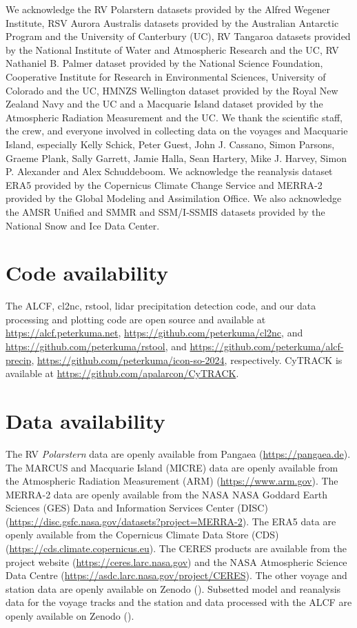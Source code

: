 \documentclass[12pt,a4paper]{article}
\begin{document}
We acknowledge the RV Polarstern datasets provided by the Alfred Wegener
Institute, RSV Aurora Australis datasets provided by the Australian Antarctic
Program and the University of Canterbury (UC), RV Tangaroa datasets provided by
the National Institute of Water and Atmospheric Research and the UC, RV
Nathaniel B. Palmer dataset provided by the National Science Foundation,
Cooperative Institute for Research in Environmental Sciences, University of
Colorado and the UC, HMNZS Wellington dataset provided by the Royal New Zealand
Navy and the UC and a Macquarie Island dataset provided by the Atmospheric
Radiation Measurement and the UC. We thank the scientiﬁc staff, the crew, and
everyone involved in collecting data on the voyages and Macquarie Island,
especially Kelly Schick, Peter Guest, John J. Cassano, Simon Parsons, Graeme
Plank, Sally Garrett, Jamie Halla, Sean Hartery, Mike J.  Harvey, Simon P.
Alexander and Alex Schuddeboom. We acknowledge the reanalysis dataset ERA5
provided by the Copernicus Climate Change Service and MERRA-2 provided by the
Global Modeling and Assimilation Office. We also acknowledge the AMSR Uniﬁed
and SMMR and SSM/I-SSMIS datasets provided by the National Snow and Ice Data
Center.

\section*{Code availability}

The ALCF, cl2nc, rstool, lidar precipitation detection code, and our data
processing and plotting code are open source and available at
\url{https://alcf.peterkuma.net}, \url{https://github.com/peterkuma/cl2nc}, and
\url{https://github.com/peterkuma/rstool}, and
\url{https://github.com/peterkuma/alcf-precip},
\url{https://github.com/peterkuma/icon-so-2024}, respectively. CyTRACK is
available at \url{https://github.com/apalarcon/CyTRACK}.

\section*{Data availability}

The RV \emph{Polarstern} data are openly available from Pangaea
(\url{https://pangaea.de}). The MARCUS and Macquarie Island (MICRE) data are
openly available from the Atmospheric Radiation Measurement (ARM)
(\url{https://www.arm.gov}). The MERRA-2 data are openly available from the
NASA NASA Goddard Earth Sciences (GES) Data and Information Services Center
(DISC) (\url{https://disc.gsfc.nasa.gov/datasets?project=MERRA-2}).  The ERA5
data are openly available from the Copernicus Climate Data Store (CDS)
(\url{https://cds.climate.copernicus.eu}). The CERES products are available
from the project website (\url{https://ceres.larc.nasa.gov}) and the NASA
Atmospheric Science Data Centre
(\url{https://asdc.larc.nasa.gov/project/CERES}).  The other voyage and station
data are openly available on Zenodo (). Subsetted model and reanalysis data for
the voyage tracks and the station and data processed with the ALCF are openly
available on Zenodo ().

\footnotesize
\setlength{\bibsep}{0.0pt}

\end{document}
